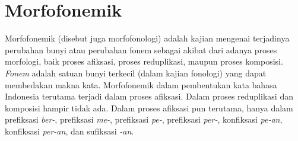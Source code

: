 






\section{Morfofonemik}
\label{sec:morfofonemik}

Morfofonemik (disebut juga morfofonologi) adalah kajian mengenai terjadinya perubahan bunyi atau perubahan fonem sebagai akibat dari adanya proses morfologi, baik proses afiksasi, proses reduplikasi, maupun proses komposisi\cite{chaer:08:morfologi}. \textit{Fonem} adalah satuan bunyi terkecil (dalam kajian fonologi) yang dapat membedakan makna kata. Morfofonemik dalam pembentukan kata bahasa Indonesia terutama terjadi dalam proses afiksasi. Dalam proses reduplikasi dan komposisi hampir tidak ada. Dalam proses afiksasi pun terutama, hanya dalam prefiksasi \textit{ber-}, prefiksasi \textit{me-}, prefiksasi \textit{pe-}, prefiksasi \textit{per-}, konfiksasi \textit{pe-an}, konfiksasi \textit{per-an}, dan sufiksasi \textit{-an}. 

